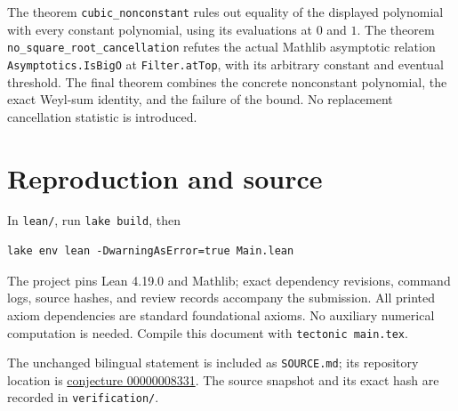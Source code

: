 \documentclass[11pt]{article}
\begin{document}
The theorem \texttt{cubic\_nonconstant} rules out equality of the displayed polynomial with every constant polynomial, using its evaluations at $0$ and $1$. The theorem \texttt{no\_square\_root\_cancellation} refutes the actual Mathlib asymptotic relation \texttt{Asymptotics.IsBigO} at \texttt{Filter.atTop}, with its arbitrary constant and eventual threshold. The final theorem combines the concrete nonconstant polynomial, the exact Weyl-sum identity, and the failure of the bound. No replacement cancellation statistic is introduced.

\section*{Reproduction and source}
In \texttt{lean/}, run \texttt{lake build}, then
\begin{verbatim}
lake env lean -DwarningAsError=true Main.lean
\end{verbatim}
The project pins Lean 4.19.0 and Mathlib; exact dependency revisions, command logs, source hashes, and review records accompany the submission. All printed axiom dependencies are standard foundational axioms. No auxiliary numerical computation is needed. Compile this document with \texttt{tectonic main.tex}.

The unchanged bilingual statement is included as \texttt{SOURCE.md}; its repository location is \href{https://github.com/The-Last-Math-Competition/The-Last-Math-Competition/blob/main/conjectures/00000008331.md}{conjecture 00000008331}. The source snapshot and its exact hash are recorded in \texttt{verification/}.
\end{document}
